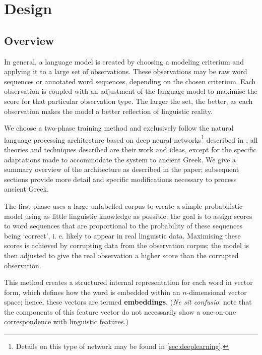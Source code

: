 \chapter{Design}
\label{chp:design} %

\section{Overview}
In general, a language model is created by choosing a modeling
criterium and applying it to a large set of observations. These
observations may be raw word sequences or annotated word sequences,
depending on the chosen criterium. Each observation is coupled with an
adjustment of the language model to maximise the score for that
particular observation type. The larger the set, the better, as each
observation makes the model a better reflection of linguistic reality.

We choose a two-phase training method and exclusively follow the
natural language processing architecture based on deep neural
networks\footnote{Details on this type of network may be found in
\vref{sec:deeplearning}.} described in \cite{collobert-2011}; all
theories and techniques described are their work and ideas, except for
the specific adaptations made to accommodate the system to ancient
Greek. We give a summary overview of the architecture as described in
the paper; subsequent sections provide more detail and specific
modifications necessary to process ancient Greek.

The first phase uses a large unlabelled corpus to create a simple
probabilistic model using as little linguistic knowledge as possible:
the goal is to assign scores to word sequences that are proportional
to the probability of these sequences being `correct', i. e. likely to
appear in real linguistic data. Maximising these scores is achieved by
corrupting data from the observation corpus; the model is then
adjusted to give the real observation a higher score than the
corrupted observation.

This method creates a structured internal representation for each word
in vector form, which defines how the word is embedded within an
$n$-dimensional vector space; hence, these vectors are termed
\textbf{embeddings}. (\textit{Ne sit confusio}: note that the
components of this feature vector do not necessarily show a one-on-one
correspondence with linguistic features.)

